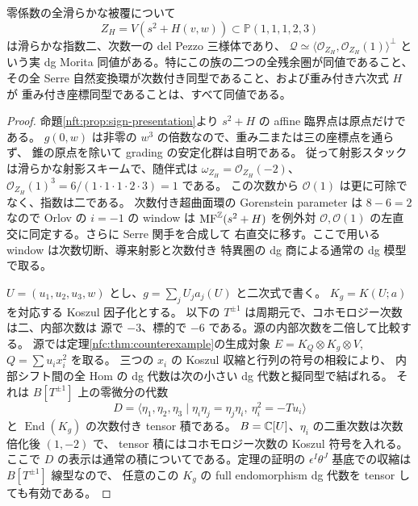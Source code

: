 \begin{theorem}\label{nft:thm:sign-sextic-kernel}
零係数の全滑らかな被覆について
\[
 Z_H=V(s^2+H(v,w))\subset\mathbb P(1,1,1,2,3)
\]
は滑らかな指数二、次数一の del Pezzo 三様体であり、
$\mathcal Q\simeq \langle\mathcal O_{Z_H},\mathcal O_{Z_H}(1)\rangle^\perp$
という実 dg Morita 同値がある。特にこの族の二つの全残余圏が同値であること、
その全 Serre 自然変換環が次数付き同型であること、および重み付き六次式 $H$ が
重み付き座標同型であることは、すべて同値である。
\end{theorem}
\begin{proof}
命題\ref{nft:prop:sign-presentation}より $s^2+H$ の affine 臨界点は原点だけである。
$g(0,w)$ は非零の $w^3$ の倍数なので、重み二または三の座標点を通らず、
錐の原点を除いて grading の安定化群は自明である。
従って射影スタックは滑らかな射影スキームで、随伴式は
$\omega_{Z_H}=\mathcal O_{Z_H}(-2)$、
$\mathcal O_{Z_H}(1)^3=6/(1\cdot1\cdot1\cdot2\cdot3)=1$ である。
この次数から $\mathcal O(1)$ は更に可除でなく、指数は二である。
次数付き超曲面環の Gorenstein parameter は $8-6=2$ なので
Orlov \cite[Theorems~2.5(i), 3.10, Proposition~2.17]{NFMOrlovSingularities}の
$i=-1$ の window は $\operatorname{MF}^{\mathbb Z}(s^2+H)$ を例外対
$\mathcal O,\mathcal O(1)$ の左直交に同定する。さらに Serre 関手を合成して
右直交に移す。ここで用いる window は次数切断、導来射影と次数付き
特異圏の dg 商による通常の dg 模型で取る。

$U=(u_1,u_2,u_3,w)$ とし、$g=\sum_j U_j a_j(U)$ と二次式で書く。
$K_g=K(U;a)$ を対応する Koszul 因子化とする。
以下の $T^{\pm1}$ は周期元で、コホモロジー次数は二、内部次数は
源で $-3$、標的で $-6$ である。源の内部次数を二倍して比較する。
源では定理\ref{nfc:thm:counterexample}の生成対象
$E=K_Q\otimes K_g\otimes V$, $Q=\sum u_i x_i^2$ を取る。
三つの $x_i$ の Koszul 収縮と行列の符号の相殺により、
内部シフト間の全 Hom の dg 代数は次の小さい dg 代数と擬同型で結ばれる。
それは $B[T^{\pm1}]$ 上の零微分の代数
\[
 D=\langle\eta_1,\eta_2,\eta_3\mid
 \eta_i\eta_j=\eta_j\eta_i,\ \eta_i^2=-T u_i\rangle
\]
と $\operatorname{End}(K_g)$ の次数付き tensor 積である。
$B=\mathbb C[U]$、$\eta_i$ の二重次数は次数倍化後 $(1,-2)$ で、
tensor 積にはコホモロジー次数の Koszul 符号を入れる。
ここで $D$ の表示は通常の積についてである。定理の証明の
$\epsilon^I\theta^J$ 基底での収縮は $B[T^{\pm1}]$ 線型なので、
任意のこの $K_g$ の full endomorphism dg 代数を tensor しても有効である。


\end{proof}
